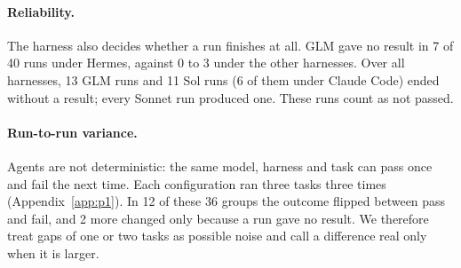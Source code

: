 \paragraph{Reliability.}
The harness also decides whether a run finishes at all. GLM gave no result in 7 of 40 runs under Hermes, against
0 to 3 under the other harnesses. Over all harnesses, 13 GLM runs and 11 Sol runs (6 of them under Claude Code)
ended without a result; every Sonnet run produced one. These runs count as not passed.

\paragraph{Run-to-run variance.}
Agents are not deterministic: the same model, harness and task can pass once and fail the next time. Each
configuration ran three tasks three times (Appendix~\ref{app:p1}). In 12 of these 36 groups the outcome
flipped between pass and fail, and 2 more changed only because a run gave no result. We therefore treat gaps of
one or two tasks as possible noise and call a difference real only when it is larger.
